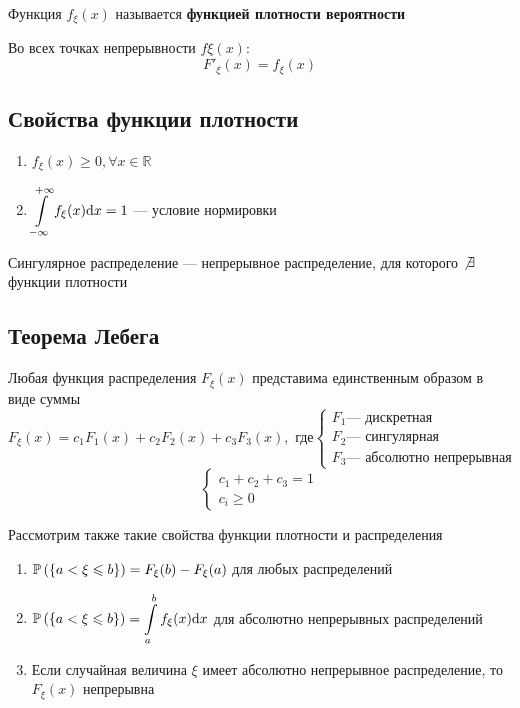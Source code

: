 \documentclass[a4paper, 10pt]{article}
\begin{document}
 Функция $f_\xi(x)$ называется \textbf{функцией плотности вероятности}

\comment Во всех точках непрерывности $f\xi(x)$:
\begin{equation*}
    F'_\xi(x)=f_\xi(x)
\end{equation*}

\subsection{Свойства функции плотности}
\begin{enumerate}
    \item $f_\xi(x)\geqslant 0, \forall x\in\mathbb{R}$
    \item $\displaystyle\int\limits_{-\infty}^{+\infty}f_\xi(x)\text{d}x=1$ — условие нормировки
\end{enumerate}

 Сингулярное распределение — непрерывное распределение, для которого $\not\exists$ функции плотности

\subsection{Теорема Лебега}
\theorem Любая функция распределения $F_\xi(x)$ представима единственным образом в виде суммы 
\begin{equation*}
    F_\xi(x)=c_1F_1(x)+c_2F_2(x)+c_3F_3(x),\text{ где}\begin{cases}
        F_1 \text{— дискретная}\\
        F_2 \text{— сингулярная}\\
        F_3 \text{— абсолютно непрерывная}
    \end{cases}
\end{equation*}
\begin{equation*}
    \begin{cases}
        c_1+c_2+c_3=1\\
        c_i\geq 0
    \end{cases}
\end{equation*}

\comment Рассмотрим также такие свойства функции плотности и распределения
\begin{enumerate}
    \item $\mathbb{P}\left(\{a<\xi\leqslant b\}\right)=F_\xi(b)-F_\xi(a)$ для любых распределений
    \item $\mathbb{P}\left(\{a<\xi\leqslant b\}\right)=\displaystyle\int\limits^b_a f_\xi(x)\text{d}x$ для абсолютно непрерывных распределений
    \item Если случайная величина $\xi$ имеет абсолютно непрерывное распределение, то $F_\xi(x)$ непрерывна
\end{enumerate}
\end{document}
